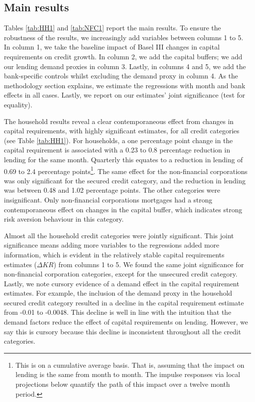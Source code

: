 \documentclass[
  12,
]{article}
\begin{document}
\hypertarget{main-results}{%
\subsection{Main results}\label{main-results}}

Tables \ref{tab:HH1} and \ref{tab:NFC1} report the main results. To ensure the robustness of the results, we increasingly add variables between columns 1 to 5. In column 1, we take the baseline impact of Basel III changes in capital requirements on credit growth. In column 2, we add the capital buffers; we add our lending demand proxies in column 3. Lastly, in columns 4 and 5, we add the bank-specific controls whilst excluding the demand proxy in column 4. As the methodology section explains, we estimate the regressions with month and bank effects in all cases. Lastly, we report on our estimates' joint significance (test for equality).

The household results reveal a clear contemporaneous effect from changes in capital requirements, with highly significant estimates, for all credit categories (see Table \ref{tab:HH1}). For households, a one percentage point change in the capital requirement is associated with a 0.23 to 0.8 percentage reduction in lending for the same month. Quarterly this equates to a reduction in lending of 0.69 to 2.4 percentage points\footnote{This is on a cumulative average basis. That is, assuming that the impact on lending is the same from month to month. The impulse responses via local projections below quantify the path of this impact over a twelve month period.}. The same effect for the non-financial corporations was only significant for the secured credit category, and the reduction in lending was between 0.48 and 1.02 percentage points. The other categories were insignificant. Only non-financial corporations mortgages had a strong contemporaneous effect on changes in the capital buffer, which indicates strong risk aversion behaviour in this category.

Almost all the household credit categories were jointly significant. This joint significance means adding more variables to the regressions added more information, which is evident in the relatively stable capital requirements estimates (\(\Delta KR\)) from columns 1 to 5. We found the same joint significance for non-financial corporation categories, except for the unsecured credit category. Lastly, we note cursory evidence of a demand effect in the capital requirement estimates. For example, the inclusion of the demand proxy in the household secured credit category resulted in a decline in the capital requirement estimate from -0.01 to -0.0048. This decline is well in line with the intuition that the demand factors reduce the effect of capital requirements on lending. However, we say this is cursory because this decline is inconsistent throughout all the credit categories.
\end{document}
